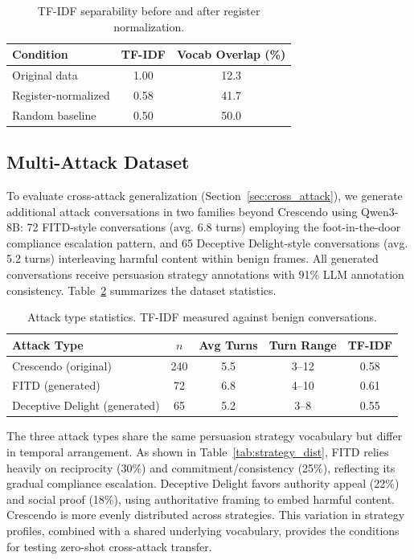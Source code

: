 \documentclass[11pt,a4paper]{article}
\begin{document}
\begin{table}[t]
\centering
\caption{TF-IDF separability before and after register normalization.}
\label{tab:tfidf_diagnostic}
\begin{tabular}{lcc}
\toprule
\textbf{Condition} & \textbf{TF-IDF} & \textbf{Vocab Overlap (\%)} \\
\midrule
Original data & 1.00 & 12.3 \\
Register-normalized & 0.58 & 41.7 \\
Random baseline & 0.50 & 50.0 \\
\bottomrule
\end{tabular}
\end{table}

\subsection{Multi-Attack Dataset}
\label{sec:multi_attack_data}

To evaluate cross-attack generalization (Section~\ref{sec:cross_attack}), we generate additional attack conversations in two families beyond Crescendo using Qwen3-8B: 72 FITD-style conversations (avg. 6.8 turns) employing the foot-in-the-door compliance escalation pattern, and 65 Deceptive Delight-style conversations (avg. 5.2 turns) interleaving harmful content within benign frames. All generated conversations receive persuasion strategy annotations with 91\% LLM annotation consistency. Table~\ref{tab:attack_stats} summarizes the dataset statistics.

\begin{table}[t]
\centering
\caption{Attack type statistics. TF-IDF measured against benign conversations.}
\label{tab:attack_stats}
\begin{tabular}{lcccc}
\toprule
\textbf{Attack Type} & \textbf{$n$} & \textbf{Avg Turns} & \textbf{Turn Range} & \textbf{TF-IDF} \\
\midrule
Crescendo (original) & 240 & 5.5 & 3--12 & 0.58 \\
FITD (generated) & 72 & 6.8 & 4--10 & 0.61 \\
Deceptive Delight (generated) & 65 & 5.2 & 3--8 & 0.55 \\
\bottomrule
\end{tabular}
\end{table}

The three attack types share the same persuasion strategy vocabulary but differ in temporal arrangement. As shown in Table~\ref{tab:strategy_dist}, FITD relies heavily on reciprocity (30\%) and commitment/consistency (25\%), reflecting its gradual compliance escalation. Deceptive Delight favors authority appeal (22\%) and social proof (18\%), using authoritative framing to embed harmful content. Crescendo is more evenly distributed across strategies. This variation in strategy profiles, combined with a shared underlying vocabulary, provides the conditions for testing zero-shot cross-attack transfer.
\end{document}
